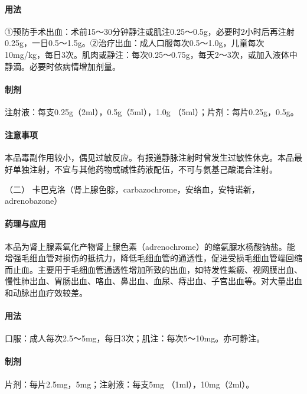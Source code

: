 \paragraph{用法}

①预防手术出血：术前15～30分钟静注或肌注0.25～0.5g，必要时2小时后再注射0.25g，一日0.5～1.5g。②治疗出血：成人口服每次0.5～1.0g，儿童每次10mg/kg，每日3次。肌肉或静注：每次0.25～0.75g，每天2～3次，或加入液体中静滴。必要时依病情增加剂量。

\paragraph{制剂}

注射液：每支0.25g（2ml），0.5g（5ml），1.0g
（5ml）；片剂：每片0.25g，0.5g。

\paragraph{注意事项}

本品毒副作用较小，偶见过敏反应。有报道静脉注射时曾发生过敏性休克。本品最好单独注射，不宜与其他药物或碱性药液配伍，不可与氨基己酸混合注射。

\hypertarget{text00438.htmlux5cux23CHP17-8-3-2}{}
（二）
卡巴克洛（肾上腺色腙，carbazochrome，安络血，安特诺新，adrenobazone）

\paragraph{药理与应用}

本品为肾上腺素氧化产物肾上腺色素（adrenochrome）的缩氨脲水杨酸钠盐。能增强毛细血管对损伤的抵抗力，降低毛细血管的通透性，促进受损毛细血管端回缩而止血。主要用于毛细血管通透性增加所致的出血，如特发性紫癜、视网膜出血、慢性肺出血、胃肠出血、咯血、鼻出血、血尿、痔出血、子宫出血等。对大量出血和动脉出血疗效较差。

\paragraph{用法}

口服：成人每次2.5～5mg，每日3次；肌注：每次5～10mg。亦可静注。

\paragraph{制剂}

片剂：每片2.5mg，5mg；注射液：每支5mg （1ml），10mg（2ml）。

